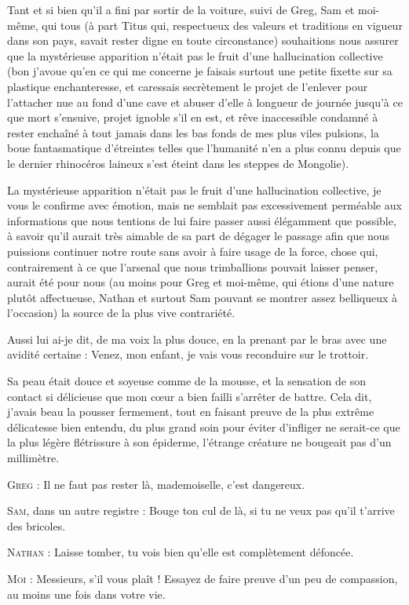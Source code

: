 Tant et si bien qu’il a fini par sortir de la voiture, suivi de Greg, Sam et moi-même, qui tous (à part Titus qui, respectueux des valeurs et traditions en vigueur dans son pays, savait rester digne en toute circonstance) souhaitions nous assurer que la mystérieuse apparition n’était pas le fruit d’une hallucination collective (bon j’avoue qu’en ce qui me concerne je faisais surtout une petite fixette sur sa plastique enchanteresse, et caressais secrètement le projet de l’enlever pour l’attacher nue au fond d’une cave et abuser d’elle à longueur de journée jusqu’à ce que mort s’ensuive, projet ignoble s’il en est, et rêve inaccessible condamné à rester enchaîné à tout jamais dans les bas fonds de mes plus viles pulsions, la boue fantasmatique d’étreintes telles que l’humanité n’en a plus connu depuis que le dernier rhinocéros laineux s’est éteint dans les steppes de Mongolie).

La mystérieuse apparition n’était pas le fruit d’une hallucination collective, je vous le confirme avec émotion, mais ne semblait pas excessivement perméable aux informations que nous tentions de lui faire passer aussi élégamment que possible, à savoir qu’il aurait très aimable de sa part de dégager le passage afin que nous puissions continuer notre route sans avoir à faire usage de la force, chose qui, contrairement à ce que l’arsenal que nous trimballions pouvait laisser penser, aurait été pour nous (au moins pour Greg et moi-même, qui étions d’une nature plutôt affectueuse, Nathan et surtout Sam pouvant se montrer assez belliqueux à l’occasion) la source de la plus vive contrariété.


\begin{dialogue}

Aussi lui ai-je dit, de ma voix la plus douce, en la prenant par le bras avec une avidité certaine : Venez, mon enfant, je vais vous reconduire sur le trottoir.

\end{dialogue}

Sa peau était douce et soyeuse comme de la mousse, et la sensation de son contact si délicieuse que mon cœur a bien failli s’arrêter de battre. Cela dit, j’avais beau la pousser fermement, tout en faisant preuve de la plus extrême délicatesse bien entendu, du plus grand soin pour éviter d’infliger ne serait-ce que la plus légère flétrissure à son épiderme, l’étrange créature ne bougeait pas d’un millimètre.

\begin{dialogue}

\textsc{Greg} : Il ne faut pas rester là, mademoiselle, c’est dangereux.

\textsc{Sam}, dans un autre registre : Bouge ton cul de là, si tu ne veux pas qu’il t’arrive des bricoles.

\textsc{Nathan} : Laisse tomber, tu vois bien qu’elle est complètement défoncée.

\textsc{Moi} : Messieurs, s’il vous plaît ! Essayez de faire preuve d’un peu de compassion, au moins une fois dans votre vie.

\end{dialogue}

